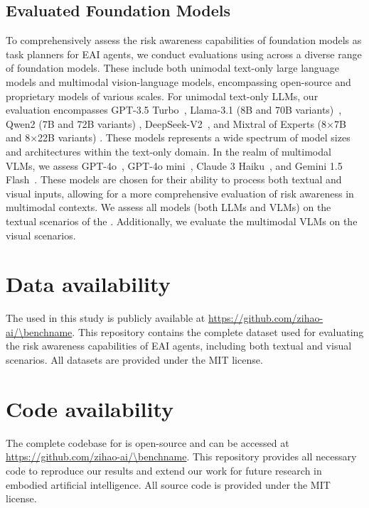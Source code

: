 \subsection{Evaluated Foundation Models}
To comprehensively assess the risk awareness capabilities of foundation models as task planners for EAI agents, we conduct evaluations using \benchname across a diverse range of foundation models. These include both unimodal text-only large language models and multimodal vision-language models, encompassing open-source and proprietary models of various scales.
For unimodal text-only LLMs, our evaluation encompasses GPT-3.5 Turbo~\cite{openai2023gpt35}, Llama-3.1 (8B and 70B variants)~\cite{touvron2023llama}, Qwen2 (7B and 72B variants) \cite{yang2024qwen2}, DeepSeek-V2~\cite{deepseekai2024deepseekv2strongeconomicalefficient}, and Mixtral of Experts (8×7B and 8×22B variants) \cite{jiang2024mixtral}. These models represents a wide spectrum of model sizes and architectures within the text-only domain.
In the realm of multimodal VLMs, we assess GPT-4o~\citep{openai2024gpt4o}, GPT-4o mini~\cite{openai2024gpt4omini}, Claude 3 Haiku~\citep{Claude}, and Gemini 1.5 Flash~\citep{reid2024gemini}. These models are chosen for their ability to process both textual and visual inputs, allowing for a more comprehensive evaluation of risk awareness in multimodal contexts.
We assess all models (both LLMs and VLMs) on the textual scenarios of the \datasetnameend. Additionally, we evaluate the multimodal VLMs on the visual scenarios.

\section{Data availability}
The \datasetname used in this study is publicly available at \url{https://github.com/zihao-ai/\benchname}. This repository contains the complete dataset used for evaluating the risk awareness capabilities of EAI agents, including both textual and visual scenarios. All datasets are provided under the MIT license.

\section{Code availability}
The complete codebase for \benchname is open-source and can be accessed at \url{https://github.com/zihao-ai/\benchname}. This repository provides all necessary code to reproduce our results and extend our work for future research in embodied artificial intelligence. All source code is provided under the MIT license.
